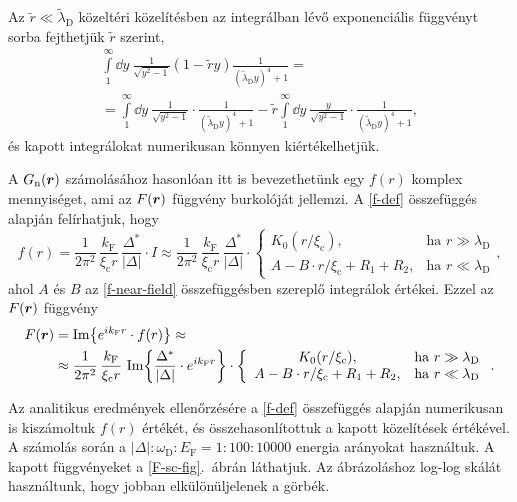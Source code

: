 \documentclass[a4paper,12pt,titlepage]{article}
\newcommand{\RR}{{\vb*{r}}}
\newcommand{\kF}{{k_\text{F}}}
\newcommand{\EF}{{E_\text{F}}}
\newcommand{\xic}{{\xi_\text{c}}}
\begin{document}
Az $\tilde{r} \ll \tilde{\lambda}_\text{D}$ közeltéri közelítésben az integrálban lévő exponenciális függvényt sorba fejthetjük $\tilde{r}$ szerint,
\begin{multline} \label{f-near-field}
	\int\limits_1^\infty \dd{y} ~ \frac{1}{\sqrt{y^2 - 1}} \left( 1 - \tilde{r} y \right) \frac{1}{\left( \tilde{\lambda}_\text{D} y \right)^4 + 1} = \\
	= \int\limits_1^\infty \dd{y} ~ \frac{1}{\sqrt{y^2 - 1}} \cdot \frac{1}{\left( \tilde{\lambda}_\text{D} y \right)^4 + 1} - \tilde{r} \int\limits_1^\infty \dd{y} ~ \frac{y}{\sqrt{y^2 - 1}} \cdot \frac{1}{\left( \tilde{\lambda}_\text{D} y \right)^4 + 1},
\end{multline}
és kapott integrálokat numerikusan könnyen kiértékelhetjük.

A $G_\text{n}(\RR)$ számolásához hasonlóan itt is bevezethetünk egy $f(r)$ komplex mennyiséget, ami az $F(\RR)$ függvény burkolóját jellemzi.  A \eqref{f-def} összefüggés alapján felírhatjuk, hogy
\begin{equation}
	f(r) = \frac{1}{2 \pi^2} \, \frac{\kF}{\xic r} \, \frac{\Delta^*}{\left| \Delta \right|} \cdot I \approx \frac{1}{2 \pi^2} \, \frac{\kF}{\xic r} \, \frac{\Delta^*}{\left| \Delta \right|} \cdot \left\{ \begin{array}{cl}
		K_0(r / \xic), & \text{ha } r \gg \lambda_\text{D} \\
		A - B \cdot r / \xic + R_1 + R_2, & \text{ha } r \ll \lambda_\text{D}
	\end{array} \right. ,
\end{equation}
ahol $A$ és $B$ az \eqref{f-near-field} összefüggésben szereplő integrálok értékei.  Ezzel az $F(\RR)$ függvény
\begin{equation}
\begin{split}
	F(\RR) & = \Im{e^{i \kF r} \cdot f(r)} \approx \\
	& \approx \frac{1}{2 \pi^2} \, \frac{\kF}{\xic r} \, \Im{\frac{\Delta^*}{\left| \Delta \right|} \cdot e^{i \kF r}} \cdot \left\{ \begin{array}{cl}
		K_0(r / \xic), & \text{ha } r \gg \lambda_\text{D} \\
		A - B \cdot r / \xic + R_1 + R_2, & \text{ha } r \ll \lambda_\text{D}
	\end{array} \right. .
\end{split}
\end{equation}

Az analitikus eredmények ellenőrzésére a \eqref{f-def} összefüggés alapján numerikusan is kiszámoltuk $f(r)$ értékét, és összehasonlítottuk a kapott közelítések értékével.  A számolás során a $\left| \Delta \right| : \omega_\text{D} : \EF = 1 : 100 : 10000$ energia arányokat használtuk.  A kapott függvényeket a \ref{F-sc-fig}.\ ábrán láthatjuk.  Az ábrázoláshoz log-log skálát használtunk, hogy jobban elkülönüljelenek a görbék.
\end{document}
